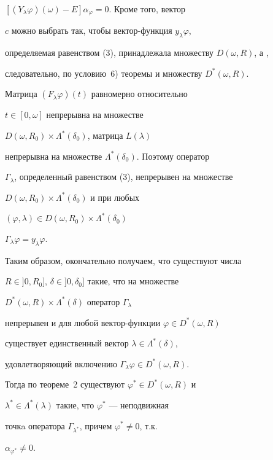 \begin{pf}
$[(Y_\lambda\varphi)(\omega)-E]\alpha_\varphi=0$. Кроме того, вектор 


$c$ можно выбрать так, чтобы вектор-функция $y_\lambda\varphi$, 


определяемая равенством (3), принадлежала множеству $D(\omega,R)$, а , 


следовательно, по условию~6) теоремы и множеству $D^*(\omega,R)$. 


 


Матрица $(F_\lambda\varphi)(t)$ равномерно относительно 


$t\in[0,\omega]$ непрерывна на множестве 


$D(\omega,R_0)\times\Lambda^*(\delta_0)$, матрица $L(\lambda)$ 


непрерывна на множестве $\Lambda^*(\delta_0)$. Поэтому оператор 


$\Gamma_\lambda$, определенный равенством (3), непрерывен на множестве 


$D(\omega,R_0)\times\Lambda^*(\delta_0)$ и при любых 


$(\varphi,\lambda)\in D(\omega,R_0)\times\Lambda^*(\delta_0)$\; 


$\Gamma_\lambda\varphi=y_\lambda\varphi$. 


 


Таким образом, окончательно получаем, что существуют числа 


$R\in]0,R_0]$, $\delta\in]0,\delta_0]$ такие, что на множестве 


$D^*(\omega,R)\times\Lambda^*(\delta)$ оператор $\Gamma_\lambda$ 


непрерывен и для любой вектор-функции $\varphi\in D^*(\omega,R)$ 


существует единственный вектор $\lambda\in\Lambda^*(\delta)$, 


удовлетворяющий включению $\Gamma_\lambda\varphi\in D^*(\omega,R)$. 


Тогда по теореме~2 существуют $\varphi^*\in D^*(\omega,R)$ и 


$\lambda^*\in\Lambda^*(\lambda)$ такие, что $\varphi^*$ --- неподвижная 


точкa оператора $\Gamma_{\lambda^*}$, причем $\varphi^*\ne0$, т.к. 


$\alpha_{\varphi^*}\ne0$.


\end{pf} 


 


